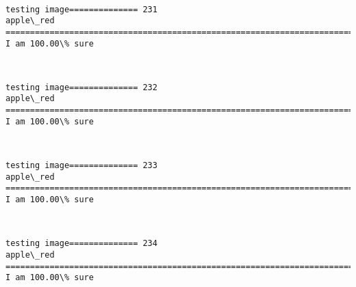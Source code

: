 \documentclass[11pt]{article}
\begin{document}
    \begin{center}
    \end{center}
    { \hspace*{\fill} \\}
    
    \begin{Verbatim}[commandchars=\\\{\}]
testing image============== 231
apple\_red
============================================================================
I am 100.00\% sure

    \end{Verbatim}

    \begin{center}
    \end{center}
    { \hspace*{\fill} \\}
    
    \begin{Verbatim}[commandchars=\\\{\}]
testing image============== 232
apple\_red
============================================================================
I am 100.00\% sure

    \end{Verbatim}

    \begin{center}
    \end{center}
    { \hspace*{\fill} \\}
    
    \begin{Verbatim}[commandchars=\\\{\}]
testing image============== 233
apple\_red
============================================================================
I am 100.00\% sure

    \end{Verbatim}

    \begin{center}
    \end{center}
    { \hspace*{\fill} \\}
    
    \begin{Verbatim}[commandchars=\\\{\}]
testing image============== 234
apple\_red
============================================================================
I am 100.00\% sure

    \end{Verbatim}
\end{document}

